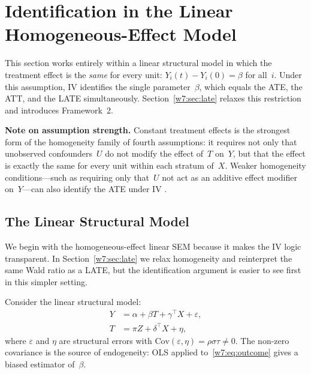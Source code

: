 \documentclass[master.tex]{subfiles}
\begin{document}
\section{Identification in the Linear Homogeneous-Effect Model}
\label{w7:sec:linear}

\begin{tcolorbox}[defstyle, title={Framework 1: Constant Treatment Effect and Linear Structure}]
This section works entirely within a linear structural model in
which the treatment effect is the \emph{same} for every unit:
$Y_i(t) - Y_i(0) = \beta$ for all~$i$.  Under this assumption, IV
identifies the single parameter~$\beta$, which equals the ATE, the
ATT, and the LATE simultaneously.  Section~\ref{w7:sec:late}
relaxes this restriction and introduces Framework~2.

\smallskip
\noindent\textbf{Note on assumption strength.}  Constant treatment
effects is the strongest form of the homogeneity family of fourth
assumptions: it requires not only that unobserved confounders~$U$ do
not modify the effect of~$T$ on~$Y$, but that the effect is exactly
the same for every unit within each stratum of~$X$.  Weaker
homogeneity conditions---such as requiring only that~$U$ not act as
an additive effect modifier on~$Y$---can also identify the ATE under
IV \citep{wang2018bounded}.
\end{tcolorbox}

\subsection{The Linear Structural Model}

We begin with the homogeneous-effect linear SEM because it makes the
IV logic transparent.  In Section~\ref{w7:sec:late} we relax
homogeneity and reinterpret the same Wald ratio as a LATE, but the
identification argument is easier to see first in this simpler
setting.

Consider the linear structural model:
\begin{align}
  Y &= \alpha + \beta T + \gamma^\top X + \varepsilon,
  \label{w7:eq:outcome} \\
  T &= \pi Z + \delta^\top X + \eta,
  \label{w7:eq:firststage}
\end{align}
where $\varepsilon$ and $\eta$ are structural errors with
$\mathrm{Cov}(\varepsilon, \eta) = \rho\sigma\tau \neq 0$.  The
non-zero covariance is the source of endogeneity: OLS applied
to~\eqref{w7:eq:outcome} gives a biased estimator of~$\beta$.
\end{document}
